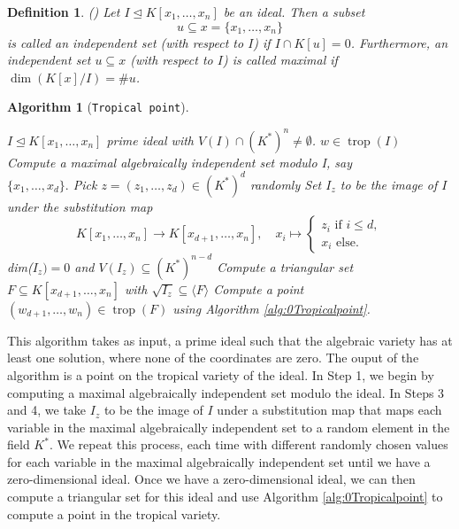 \documentclass[11pt,reqno,a4paper]{article}
\theoremstyle{theoremstyle}
\theoremstyle{examplestyle}
\newtheorem{definition}[theorem]{Definition}
\theoremstyle{algorithmstyle}
\newtheorem{algorithm}[theorem]{Algorithm}
\numberwithin{equation}{subsection}
\DeclareMathOperator{\trop}{trop}
\begin{document}
\begin{definition}
    (\cite[Def. 3.5.3]{GP2007}) Let $I \trianglelefteq K[x_1,\ldots,x_n]$ be an ideal. Then a subset \[u\subseteq x = \{x_1,\ldots,x_n\} \] is called an \textit{independent set} (with respect to $I$) if $I \cap K[u] = 0$. Furthermore, an independent set $u\subseteq x$ (with respect to $I$) is called \textit{maximal} if $\dim(K[x]/I) = \#u$. 
\end{definition}

\begin{algorithm}[\texttt{Tropical point}]\label{alg:Tropicalpoint}\
  \begin{algorithmic}[1] 
  \REQUIRE $I \trianglelefteq K[x_1,\ldots,x_n]$ prime ideal with $V(I) \cap(K^*)^n \neq \emptyset$.
  \ENSURE $w \in \trop(I)$
  \STATE Compute a maximal algebraically independent set modulo I, say \\$\{x_1,\ldots,x_d\}.$
  \REPEAT 
    \STATE Pick $z = (z_1, \ldots, z_d) \in (K^*)^d$ randomly
    \STATE Set $I_z$ to be the image of $I$ under the substitution map
    \[ K[x_1, \ldots, x_n] \rightarrow K[x_{d+1}, \ldots, x_n], \quad x_i \mapsto \begin{cases}
        z_i \text{ if } i \leq d,\\
        x_i \text{ else.}
    \end{cases}  \]
  \UNTIL dim($I_z) = 0$ and $V(I_z) \subseteq (K^*)^{n-d}$
  \STATE Compute a triangular set $F \subseteq K[x_{d+1}, \ldots, x_n]$ with $\sqrt{I_z} \subseteq \langle F\rangle$
  \STATE Compute a point $(w_{d+1}, \ldots, w_n) \in \trop(F)$ using Algorithm \ref{alg:0Tropicalpoint}.
  \RETURN{$(\nu(z), w_{d+1}, \ldots, w_n)$}
  \end{algorithmic}
\end{algorithm}
This algorithm takes as input, a prime ideal such that the algebraic variety has at least one solution, where none of the coordinates are zero. The ouput of the algorithm is a point on the tropical variety of the ideal. In Step 1, we begin by computing a maximal algebraically independent set modulo the ideal. In Steps 3 and 4, we take $I_z$ to be the image of $I$ under a substitution map that maps each variable in the maximal algebraically independent set to a random element in the field $K^*$. We repeat this process, each time with different randomly chosen values for each variable in the maximal algebraically independent set until we have a zero-dimensional ideal. Once we have a zero-dimensional ideal, we can then compute a triangular set for this ideal and use Algorithm \ref{alg:0Tropicalpoint} to compute a point in the tropical variety.
\end{document}
